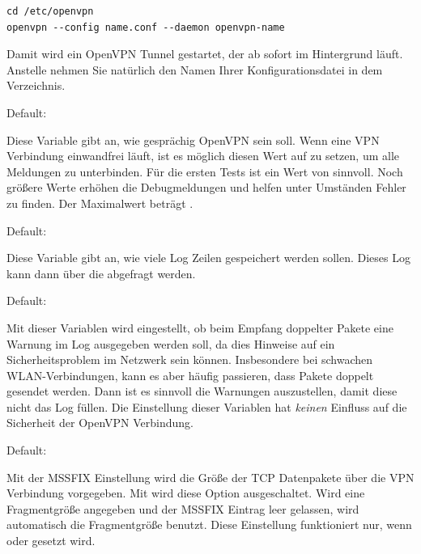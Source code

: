 \begin{description}
\begin{verbatim}
cd /etc/openvpn
openvpn --config name.conf --daemon openvpn-name
\end{verbatim}

  Damit wird ein OpenVPN Tunnel gestartet, der ab sofort im
  Hintergrund läuft. Anstelle  nehmen Sie natürlich den
  Namen Ihrer Konfigurationsdatei in dem 
  Verzeichnis.  


  Default: 

  Diese Variable gibt an, wie gesprächig OpenVPN sein soll. Wenn eine
  VPN Verbindung einwandfrei läuft, ist es möglich diesen Wert auf
   zu setzen, um alle Meldungen zu unterbinden. Für die
  ersten Tests ist ein Wert von  sinnvoll. Noch größere Werte
  erhöhen die Debugmeldungen und helfen unter Umständen Fehler zu
  finden. Der Maximalwert beträgt .


  Default: 

  Diese Variable gibt an, wie viele Log Zeilen
  gespeichert werden sollen. Dieses Log kann dann über
  die  abgefragt werden.


  Default: 

  Mit dieser Variablen wird eingestellt, ob beim Empfang doppelter
  Pakete eine Warnung im Log ausgegeben werden soll, da dies Hinweise
  auf ein Sicherheitsproblem im Netzwerk sein können. Insbesondere bei
  schwachen WLAN-Verbindungen, kann es aber häufig passieren, dass
  Pakete doppelt gesendet werden. Dann ist es sinnvoll die Warnungen
  auszustellen, damit diese nicht das Log füllen. Die Einstellung
  dieser Variablen hat \emph{keinen} Einfluss auf die Sicherheit der
  OpenVPN Verbindung.


  Default: 

  Mit der MSSFIX Einstellung wird die Größe der TCP Datenpakete über
  die VPN Verbindung vorgegeben. Mit
   wird diese Option
  ausgeschaltet. Wird eine Fragmentgröße angegeben und der MSSFIX
  Eintrag leer gelassen, wird automatisch die Fragmentgröße
  benutzt.  Diese Einstellung funktioniert nur, wenn
   oder  gesetzt wird.


\end{description}
